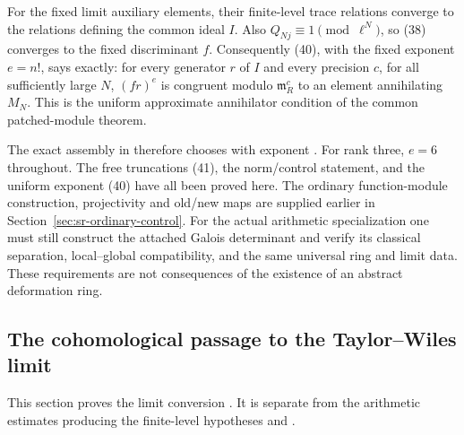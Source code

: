 For the fixed limit auxiliary elements, their finite-level
trace relations converge to the relations defining the
common ideal $I$.
Also $Q_{Nj}\equiv1\pmod{\ell^N}$, so (38) converges to the
fixed discriminant $f$.
Consequently (40), with the fixed exponent $e=n!$, says
exactly: for every generator $r$ of $I$ and every precision
$c$, for all sufficiently large $N$, $(fr)^e$ is congruent
modulo $\mathfrak m_R^c$ to an element annihilating $M_N$.
This is the uniform approximate annihilator condition of
the common patched-module theorem.

The exact assembly in  therefore chooses
 with exponent .
For rank three, $e=6$ throughout.  The free truncations
(41), the norm/control statement, and the uniform exponent
(40) have all been proved here.
The ordinary function-module construction, projectivity and old/new
maps are supplied earlier in Section~\ref{sec:sr-ordinary-control}.
For the actual arithmetic specialization one must still construct
the attached Galois determinant and verify its classical separation,
local--global compatibility, and the same universal ring and limit
data. These requirements are not consequences of the existence of
an abstract deformation ring.

\subsection{The cohomological passage to the Taylor--Wiles limit}
\label{sec:coh-at-tw-limit}

This section proves the limit conversion .
It is separate from the arithmetic estimates producing the
finite-level hypotheses  and .

